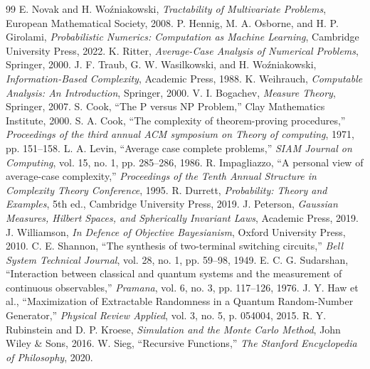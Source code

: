 \documentclass[11pt,a4paper]{report}
\begin{document}
\begin{thebibliography}{99}
 E. Novak and H. Wo\'{z}niakowski, \emph{Tractability of Multivariate Problems}, European Mathematical Society, 2008.
 P. Hennig, M. A. Osborne, and H. P. Girolami, \emph{Probabilistic Numerics: Computation as Machine Learning}, Cambridge University Press, 2022.
 K. Ritter, \emph{Average-Case Analysis of Numerical Problems}, Springer, 2000.
 J. F. Traub, G. W. Wasilkowski, and H. Wo\'{z}niakowski, \emph{Information-Based Complexity}, Academic Press, 1988.
 K. Weihrauch, \emph{Computable Analysis: An Introduction}, Springer, 2000.
 V. I. Bogachev, \emph{Measure Theory}, Springer, 2007.
 S. Cook, ``The P versus NP Problem,'' Clay Mathematics Institute, 2000.
 S. A. Cook, ``The complexity of theorem-proving procedures,'' \emph{Proceedings of the third annual ACM symposium on Theory of computing}, 1971, pp. 151--158.
 L. A. Levin, ``Average case complete problems,'' \emph{SIAM Journal on Computing}, vol. 15, no. 1, pp. 285--286, 1986.
 R. Impagliazzo, ``A personal view of average-case complexity,'' \emph{Proceedings of the Tenth Annual Structure in Complexity Theory Conference}, 1995.
 R. Durrett, \emph{Probability: Theory and Examples}, 5th ed., Cambridge University Press, 2019.
 J. Peterson, \emph{Gaussian Measures, Hilbert Spaces, and Spherically Invariant Laws}, Academic Press, 2019.
 J. Williamson, \emph{In Defence of Objective Bayesianism}, Oxford University Press, 2010.
 C. E. Shannon, ``The synthesis of two-terminal switching circuits,'' \emph{Bell System Technical Journal}, vol. 28, no. 1, pp. 59--98, 1949.
 E. C. G. Sudarshan, ``Interaction between classical and quantum systems and the measurement of continuous observables,'' \emph{Pramana}, vol. 6, no. 3, pp. 117--126, 1976.
 J. Y. Haw et al., ``Maximization of Extractable Randomness in a Quantum Random-Number Generator,'' \emph{Physical Review Applied}, vol. 3, no. 5, p. 054004, 2015.
 R. Y. Rubinstein and D. P. Kroese, \emph{Simulation and the Monte Carlo Method}, John Wiley \& Sons, 2016.
 W. Sieg, ``Recursive Functions,'' \emph{The Stanford Encyclopedia of Philosophy}, 2020.

\end{thebibliography}
\end{document}
